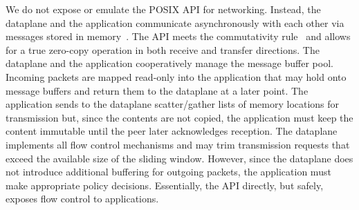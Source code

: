  We do
not expose or emulate the POSIX API for networking.  Instead, the
dataplane and the application communicate asynchronously with each
other via messages stored in
memory~\cite{rizzo2012netmap,han2012megapipe}.  The API meets the
commutativity rule~\cite{DBLP:conf/sosp/ClementsKZMK13} and allows for
a true zero-copy operation in both receive and transfer
directions. The dataplane and the application cooperatively manage the
message buffer pool. Incoming packets are mapped read-only into the
application that may hold onto message buffers and return them to the
dataplane at a later point.  The application sends to the dataplane
scatter/gather lists of memory locations for transmission but, since
the contents are not copied, the application must keep the content
immutable until the peer later acknowledges reception. The dataplane
implements all flow control mechanisms and may trim transmission
requests that exceed the available size of the sliding
window. However, since the dataplane does not introduce additional
buffering for outgoing packets, the application must make appropriate
policy decisions. Essentially, the API directly, but safely, exposes
flow control to applications.




